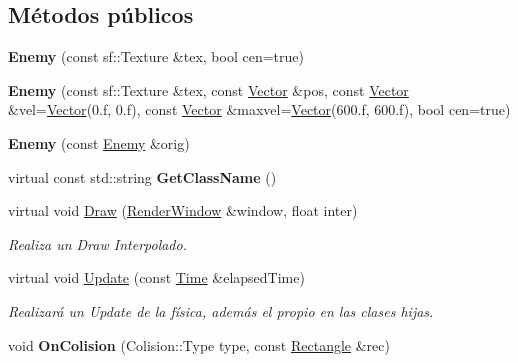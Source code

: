 \subsection*{Métodos públicos}
\begin{DoxyCompactItemize}
\item 
\hypertarget{classEnemy_a61d6ab34a7c18bde3480468e98cf9ba4}{{\bfseries Enemy} (const sf\-::\-Texture \&tex, bool cen=true)}\label{classEnemy_a61d6ab34a7c18bde3480468e98cf9ba4}

\item 
\hypertarget{classEnemy_a59302df40922f5b0193c16b5650fb3c9}{{\bfseries Enemy} (const sf\-::\-Texture \&tex, const \hyperlink{classVector}{Vector} \&pos, const \hyperlink{classVector}{Vector} \&vel=\hyperlink{classVector}{Vector}(0.f, 0.f), const \hyperlink{classVector}{Vector} \&maxvel=\hyperlink{classVector}{Vector}(600.f, 600.f), bool cen=true)}\label{classEnemy_a59302df40922f5b0193c16b5650fb3c9}

\item 
\hypertarget{classEnemy_a9719f9eedddb5950fc1e522051a93d93}{{\bfseries Enemy} (const \hyperlink{classEnemy}{Enemy} \&orig)}\label{classEnemy_a9719f9eedddb5950fc1e522051a93d93}

\item 
\hypertarget{classEnemy_a6f34d90e9ef3b2e94b2093c0d7113f13}{virtual const std\-::string {\bfseries Get\-Class\-Name} ()}\label{classEnemy_a6f34d90e9ef3b2e94b2093c0d7113f13}

\item 
virtual void \hyperlink{classEnemy_a9a34d38fac00edea2f45a9084bdfe1f6}{Draw} (\hyperlink{classRenderWindow}{Render\-Window} \&window, float inter)
\begin{DoxyCompactList}\small\item\em Realiza un Draw Interpolado. \end{DoxyCompactList}\item 
\hypertarget{classEnemy_a7c26659cca9c7efdae3ffad6af20df5f}{virtual void \hyperlink{classEnemy_a7c26659cca9c7efdae3ffad6af20df5f}{Update} (const \hyperlink{classTime}{Time} \&elapsed\-Time)}\label{classEnemy_a7c26659cca9c7efdae3ffad6af20df5f}

\begin{DoxyCompactList}\small\item\em Realizará un Update de la física, además el propio en las clases hijas. \end{DoxyCompactList}\item 
\hypertarget{classEnemy_a754ebd8eb9db54ec38695a72dd6d801b}{void {\bfseries On\-Colision} (Colision\-::\-Type type, const \hyperlink{classRectangle}{Rectangle} \&rec)}\label{classEnemy_a754ebd8eb9db54ec38695a72dd6d801b}

\end{DoxyCompactItemize}
